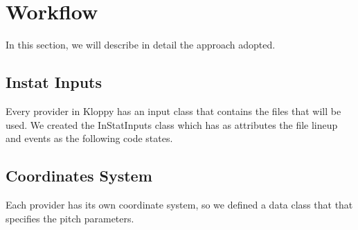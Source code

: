 \documentclass[letterpaper,10pt,english]{jupyterBook}
\begin{document}
\section{Workflow}
\label{\detokenize{Chap1/section3:workflow}}\label{\detokenize{Chap1/section3::doc}}
\sphinxAtStartPar
In this section, we will describe in detail the approach adopted.


\subsection{Instat Inputs}
\label{\detokenize{Chap1/section3:instat-inputs}}
\sphinxAtStartPar
Every provider in Kloppy has an input class that contains the files that will be used. We created the InStatInputs class which has as attributes the file line\sphinxhyphen{}up and events as the following code states.

\begin{sphinxVerbatim}[commandchars=\\\{\}]
 
     \PYG{p}{[}\PYG{p}{]}
     \PYG{p}{[}\PYG{p}{]}
\end{sphinxVerbatim}


\subsection{Coordinates System}
\label{\detokenize{Chap1/section3:coordinates-system}}
\sphinxAtStartPar
Each provider has its own coordinate system, so we defined a data class that that specifies the pitch parameters.
\end{document}
